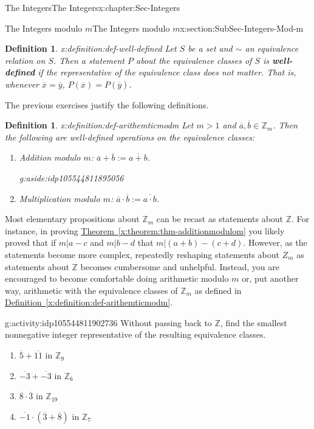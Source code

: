 \documentclass[oneside,10pt,]{book}
\newcommand{\xreffont}{\relax}
\newcommand{\terminology}[1]{\textbf{#1}}
\numberwithin{equation}{section}
\def\Z{{\mathbb Z}}
\newtheorem{definition}[theorem]{Definition}
\begin{document}
\begin{chapterptx}{The Integers}{}{The Integers}{}{}{x:chapter:Sec-Integers}
\begin{sectionptx}{The Integers modulo \(m\)}{}{The Integers modulo \(m\)}{}{}{x:section:SubSec-Integers-Mod-m}
\begin{definition}{}{x:definition:def-well-defined}
%
Let \(S\) be a set and \(\sim\) an equivalence relation on \(S\). Then a statement \(P\) about the equivalence classes of \(S\) is \terminology{well-defined} if the representative of the equivalence class does not matter. That is, whenever \(\overline{x} = \overline{y}\), \(P(\overline{x}) = P(\overline{y})\).%
\end{definition}
The previous exercises justify the following definitions.%
\begin{definition}{}{x:definition:def-arithemticmodm}%
Let \(m > 1\) and \(\overline{a},\overline{b}\in \Z_m\). Then the following are well-defined operations on the equivalence classes:%
\begin{enumerate}
\item{}\emph{Addition modulo \(m\)}: \(\overline{a} + \overline{b} := \overline{a+b}\). \begin{aside}{}{g:aside:idp105544811895056}%
\end{aside}
%
\item{}\emph{Multiplication modulo \(m\)}: \(\overline{a}\cdot \overline{b} := \overline{a\cdot b}\).%
\end{enumerate}
%
\end{definition}
Most elementary propositions about \(\Z_m\) can be recast as statements about \(\Z\). For instance, in proving \hyperref[x:theorem:thm-additionmodulom]{Theorem~{\xreffont\ref{x:theorem:thm-additionmodulom}}} you likely proved that if \(m|a-c\) and \(m|b-d\) that \(m|(a+b)-(c+d)\). However, as the statements become more complex, repeatedly reshaping statements about \(Z_m\) as statements about \(\Z\) becomes cumbersome and unhelpful. Instead, you are encouraged to become comfortable doing arithmetic modulo \(m\) or, put another way, arithmetic with the equivalence classes of \(\Z_m\) as defined in \hyperref[x:definition:def-arithemticmodm]{Definition~{\xreffont\ref{x:definition:def-arithemticmodm}}}.%
\begin{activity}{}{g:activity:idp105544811902736}%
Without passing back to \(\Z\), find the smallest nonnegative integer representative of the resulting equivalence classes.%
%
\begin{enumerate}
\item{}\(\overline{5}+\overline{11}\) in \(\Z_{9}\)%
\item{}\(\overline{-3}+\overline{-3}\) in \(\Z_{6}\)%
\item{}\(\overline{8}\cdot\overline{3}\) in \(\Z_{19}\)%
\item{}\(\overline{-1}\cdot(\overline{3}+\overline{8})\) in \(\Z_{7}\)%

\end{enumerate}
\end{activity}
\end{sectionptx}
\end{chapterptx}
\end{document}
